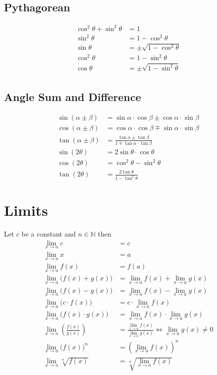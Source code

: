 \documentclass{report}
\theoremstyle{mytheoremstyle}
\theoremstyle{mytheoremstyle}
\theoremstyle{myproblemstyle}
\begin{document}
    \subsection{Pythagorean}
    \begin{align}
        \cos^2\theta+\sin^2\theta &= 1 \\
        \sin^2\theta &= 1 - \cos^2 \theta \\
        \sin\theta &= \pm\sqrt{1 - \cos^2 \theta} \\
        \cos^2\theta &= 1 - \sin^2 \theta \\
        \cos\theta &= \pm\sqrt{1 - \sin^2 \theta} \\
    \end{align}
    \subsection{Angle Sum and Difference}
    \begin{align}
        \sin(\alpha \pm \beta) &= \sin\alpha\cdot\cos\beta \pm \cos\alpha\cdot\sin\beta \\
        \cos(\alpha \pm \beta) &= \cos\alpha\cdot\cos\beta \mp \sin\alpha\cdot\sin\beta \\
        \tan(\alpha \pm \beta) &= \frac{\tan\alpha \pm \tan\beta}{1 \mp \tan\alpha\cdot\tan\beta} \\
        \sin(2\theta) &= 2\sin\theta\cdot\cos\theta \\
        \cos(2\theta) &= \cos^2\theta - \sin^2\theta \\
        \tan(2\theta) &= \frac{2\tan\theta}{1 - \tan^2\theta}
    \end{align}

    \section{Limits}
    Let \(c\) be a constant and \(n \in \mathbb{N}\)
    then
    \begin{align}
        \lim_{x \to a}c &= c \\
        \lim_{x \to a}x &= a \\
        \lim_{x \to a}f(x) &= f(a) \\
        \lim_{x \to a}\bigl(f(x) + g(x)\bigr) &= \lim_{x \to a} f(x) + \lim_{x \to a} g(x) \\
        \lim_{x \to a}\bigl(f(x) - g(x)\bigr) &= \lim_{x \to a} f(x) - \lim_{x \to a} g(x) \\
        \lim_{x \to a}\bigl(c \cdot f(x)\bigr) &= c \cdot \lim_{x \to a} f(x) \\
        \lim_{x \to a}\bigl(f(x) \cdot g(x)\bigr) &= \lim_{x \to a} f(x) \cdot \lim_{x \to a} g(x) \\
        \lim_{x \to a}\left(\frac{f(x)}{g(x)}\right) &= \frac{\displaystyle\lim_{x \to a} f(x)}{\displaystyle\lim_{x \to a} g(x)} \iff \lim_{x \to a} g(x) \ne 0 \\
        \lim_{x \to a}{\bigl(f(x)\bigr)}^n &= {\left(\lim_{x \to a} f(x)\right)}^n \\
        \lim_{x \to a}\sqrt[n]{f(x)} &= \sqrt[n]{\lim_{x \to a} f(x)}
    \end{align}
\end{document}
